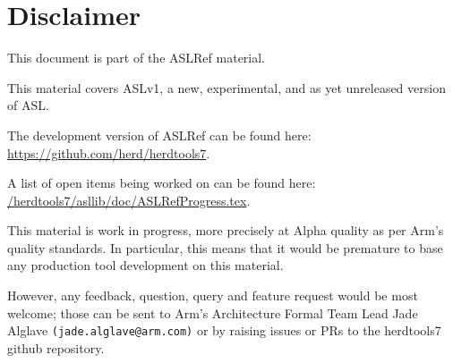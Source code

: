 \chapter{Disclaimer}

This document is part of the ASLRef material.

This material covers ASLv1, a new, experimental, and as yet unreleased version of ASL.

The development version of ASLRef can be found here: \\
\url{https://github.com/herd/herdtools7}.

A list of open items being worked on can be found here: \\
\href{https://github.com/herd/herdtools7//tree/master/asllib/doc/ASLRefProgress.tex}{/herdtools7/asllib/doc/ASLRefProgress.tex}.

This material is work in progress, more precisely at Alpha quality as
per Arm’s quality standards. In particular, this means that it would be
premature to base any production tool development on this material.

However, any feedback, question, query and feature request would be most
welcome; those can be sent to Arm’s Architecture Formal Team Lead Jade Alglave
\texttt{(jade.alglave@arm.com)} or by raising issues or PRs to the herdtools7
github repository.
